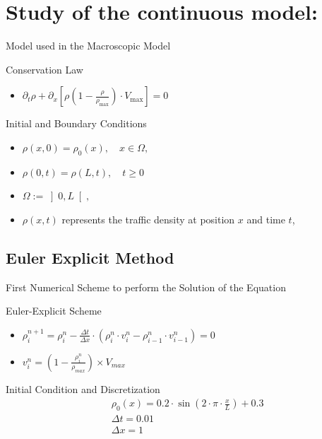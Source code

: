 \documentclass{beamer}
\begin{document}
\section{Study of the continuous model:}
\begin{frame}{Model used in the Macroscopic Model}
	\begin{alertblock}{Conservation Law}
		\begin{itemize}
			\item $\partial_t\rho + \partial_x\left[ \rho\left( 1-\frac{\rho}{\rho_{\text{max}}}\right) \cdot V_{\text{max}}\right] = 0 $
		\end{itemize}
	\end{alertblock}
	\begin{block}{Initial and Boundary Conditions}
		\begin{itemize}
			\item $\rho(x,0) = \rho_0(x), \quad x \in \Omega,$
			\item $\rho(0,t) = \rho(L,t), \quad t \geq 0$
			\item $\Omega := \left] 0,L\right[, $
			\item $\rho(x,t)$ represents the traffic density at position $x$ and time $t$, 
		\end{itemize}
	\end{block}
\end{frame}

\subsection{Euler Explicit Method}
\begin{frame}{First Numerical Scheme to perform the Solution of the Equation}
	\begin{alertblock}{Euler-Explicit Scheme}
		\begin{itemize}
			\item $\rho_{i}^{n+1} = \rho_i^n - \frac{\Delta t}{\Delta x} \cdot \left(\rho_i^n \cdot v_i^n - \rho_{i-1}^n \cdot v_{i-1}^n \right)
					=0$
		
			\item $v_i^n = \left( 1 - \frac{\rho_i^n}{\rho_{max}}\right)  \times V_{max}$
		\end{itemize}
	\end{alertblock}
	\begin{block}{Initial Condition and Discretization}
		\[
		\boxed{
			\begin{aligned}
				&\rho_0(x)=0.2 \cdot \sin\left(2 \cdot \pi \cdot \frac{x}{L}\right) + 0.3 \\
				&\Delta t = 0.01 \\
				&\Delta x = 1
			\end{aligned}
		}
		\]
	\end{block}
\end{frame}
\end{document}
